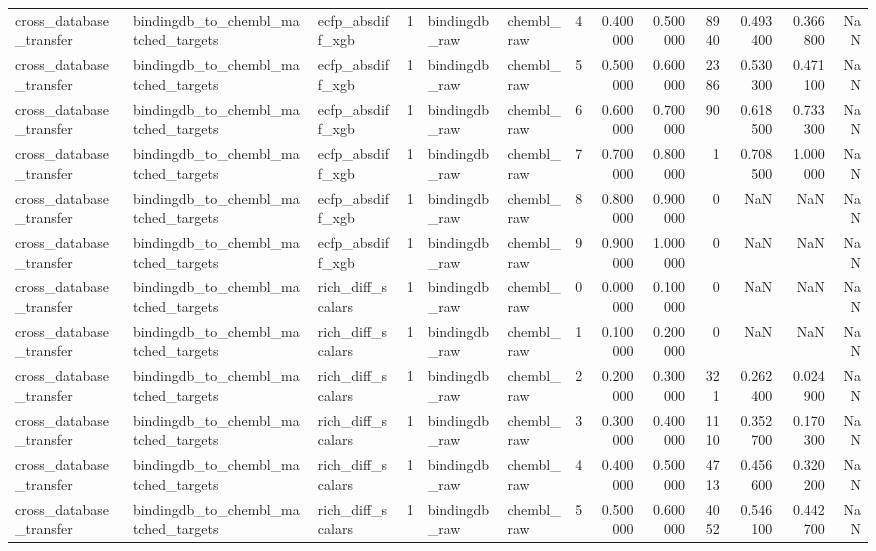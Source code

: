 \begin{longtable}{lllrllrrrrrrr}
cross\_database\_transfer & bindingdb\_to\_chembl\_matched\_targets & ecfp\_absdiff\_xgb & 1 & bindingdb\_raw & chembl\_raw & 4 & 0.400000 & 0.500000 & 8940 & 0.493400 & 0.366800 & NaN \\
cross\_database\_transfer & bindingdb\_to\_chembl\_matched\_targets & ecfp\_absdiff\_xgb & 1 & bindingdb\_raw & chembl\_raw & 5 & 0.500000 & 0.600000 & 2386 & 0.530300 & 0.471100 & NaN \\
cross\_database\_transfer & bindingdb\_to\_chembl\_matched\_targets & ecfp\_absdiff\_xgb & 1 & bindingdb\_raw & chembl\_raw & 6 & 0.600000 & 0.700000 & 90 & 0.618500 & 0.733300 & NaN \\
cross\_database\_transfer & bindingdb\_to\_chembl\_matched\_targets & ecfp\_absdiff\_xgb & 1 & bindingdb\_raw & chembl\_raw & 7 & 0.700000 & 0.800000 & 1 & 0.708500 & 1.000000 & NaN \\
cross\_database\_transfer & bindingdb\_to\_chembl\_matched\_targets & ecfp\_absdiff\_xgb & 1 & bindingdb\_raw & chembl\_raw & 8 & 0.800000 & 0.900000 & 0 & NaN & NaN & NaN \\
cross\_database\_transfer & bindingdb\_to\_chembl\_matched\_targets & ecfp\_absdiff\_xgb & 1 & bindingdb\_raw & chembl\_raw & 9 & 0.900000 & 1.000000 & 0 & NaN & NaN & NaN \\
cross\_database\_transfer & bindingdb\_to\_chembl\_matched\_targets & rich\_diff\_scalars & 1 & bindingdb\_raw & chembl\_raw & 0 & 0.000000 & 0.100000 & 0 & NaN & NaN & NaN \\
cross\_database\_transfer & bindingdb\_to\_chembl\_matched\_targets & rich\_diff\_scalars & 1 & bindingdb\_raw & chembl\_raw & 1 & 0.100000 & 0.200000 & 0 & NaN & NaN & NaN \\
cross\_database\_transfer & bindingdb\_to\_chembl\_matched\_targets & rich\_diff\_scalars & 1 & bindingdb\_raw & chembl\_raw & 2 & 0.200000 & 0.300000 & 321 & 0.262400 & 0.024900 & NaN \\
cross\_database\_transfer & bindingdb\_to\_chembl\_matched\_targets & rich\_diff\_scalars & 1 & bindingdb\_raw & chembl\_raw & 3 & 0.300000 & 0.400000 & 1110 & 0.352700 & 0.170300 & NaN \\
cross\_database\_transfer & bindingdb\_to\_chembl\_matched\_targets & rich\_diff\_scalars & 1 & bindingdb\_raw & chembl\_raw & 4 & 0.400000 & 0.500000 & 4713 & 0.456600 & 0.320200 & NaN \\
cross\_database\_transfer & bindingdb\_to\_chembl\_matched\_targets & rich\_diff\_scalars & 1 & bindingdb\_raw & chembl\_raw & 5 & 0.500000 & 0.600000 & 4052 & 0.546100 & 0.442700 & NaN \\

\end{longtable}
